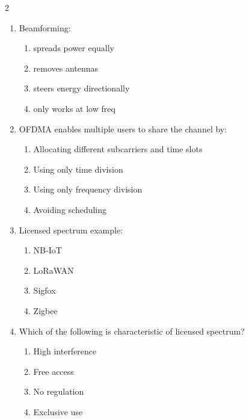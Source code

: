 \begin{multicols}{2}
\begin{enumerate}[leftmargin=*, itemsep=0.4em]
\item Beamforming:
\begin{enumerate}[label=\alph*)]
\item spreads power equally
\item removes antennas
\item steers energy directionally
\item only works at low freq
\end{enumerate}

\item OFDMA enables multiple users to share the channel by:
\begin{enumerate}[label=\alph*)]
\item Allocating different subcarriers and time slots
\item Using only time division
\item Using only frequency division
\item Avoiding scheduling
\end{enumerate}

\item Licensed spectrum example:
\begin{enumerate}[label=\alph*)]
\item NB-IoT
\item LoRaWAN
\item Sigfox
\item Zigbee
\end{enumerate}

\item Which of the following is characteristic of licensed spectrum?
\begin{enumerate}[label=\alph*)]
\item High interference
\item Free access
\item No regulation
\item Exclusive use
\end{enumerate}

\end{enumerate}
\end{multicols}